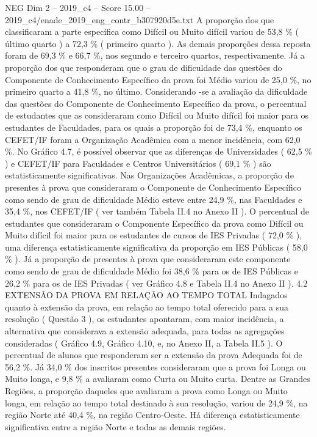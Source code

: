 \begin{textsample}{NEG Dim 2 – 2019\_c4 – Score 15.00 – 2019\_c4/enade\_2019\_eng\_contr\_b307920d5e.txt}
A proporção dos que classificaram a parte específica como Difícil ou Muito difícil variou de 53,8 \% ( último quarto ) a 72,3 \% ( primeiro quarto ).
As demais proporções dessa reposta foram de 69,3 \% e 66,7 \%, nos segundo e terceiro quartos, respectivamente.
Já a proporção dos que responderam que o grau de dificuldade das questões do Componente de Conhecimento Específico da prova foi Médio variou de 25,0 \%, no primeiro quarto a 41,8 \%, no último.
Considerando -se a avaliação da dificuldade das questões do Componente de Conhecimento Específico da prova, o percentual de estudantes que as consideraram como Difícil ou Muito difícil foi maior para os estudantes de Faculdades, para os quais a proporção foi de 73,4 \%, enquanto os CEFET/IF foram a Organização Acadêmica com a menor incidência, com 62,0 \%.
No Gráfico 4.7, é possível observar que as diferenças de Universidades ( 62,5 \% ) e CEFET/IF para Faculdades e Centros Universitários ( 69,1 \% ) são estatisticamente significativas.
Nas Organizações Acadêmicas, a proporção de presentes à prova que consideraram o Componente de Conhecimento Específico como sendo de grau de dificuldade Médio esteve entre 24,9 \%, nas Faculdades e 35,4 \%, nos CEFET/IF ( ver também Tabela II.4 no Anexo II ).
O percentual de estudantes que consideraram o Componente Específico da prova como Difícil ou Muito difícil foi maior para os estudantes de cursos de IES Privadas ( 72,0 \% ), uma diferença estatisticamente significativa da proporção em IES Públicas ( 58,0 \% ).
Já a proporção de presentes à prova que consideraram este componente como sendo de grau de dificuldade Médio foi 38,6 \% para os de IES Públicas e 26,2 \% para os de IES Privadas ( ver Gráfico 4.8 e Tabela II.4 no Anexo II ). 4.2 EXTENSÃO DA PROVA EM RELAÇÃO AO TEMPO TOTAL Indagados quanto à extensão da prova, em relação ao tempo total oferecido para a sua resolução ( Questão 3 ), os estudantes apontaram, com maior incidência, a alternativa que considerava a extensão adequada, para todas as agregações consideradas ( Gráfico 4.9, Gráfico 4.10, e, no Anexo II, a Tabela II.5 ).
O percentual de alunos que responderam ser a extensão da prova Adequada foi de 56,2 \%.
Já 34,0 \% dos inscritos presentes consideraram que a prova foi Longa ou Muito longa, e 9,8 \% a avaliaram como Curta ou Muito curta.
Dentre as Grandes Regiões, a proporção daqueles que avaliaram a prova como Longa ou Muito longa, em relação ao tempo total destinado à sua resolução, variou de 24,9 \%, na região Norte até 40,4 \%, na região Centro-Oeste.
Há diferença estatisticamente significativa entre a região Norte e todas as demais regiões.

\end{textsample}
